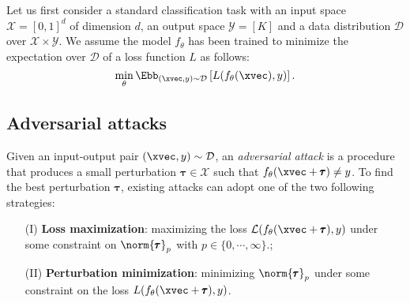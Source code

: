 

Let us first consider a standard classification task with an input space $\mathcal{X}=[0,1]^d$ of dimension $d$,  an output space $\mathcal{Y}=[K]$ and a data distribution $\mathcal D$ over $\mathcal X \times \mathcal Y$.
We assume the model $f_\theta$ has been trained to minimize the expectation over $\mathcal{D}$ of a loss function $L$ as follows:
\begin{equation}
  \min_{\theta} \Ebb_{(\xvec, y) \sim \mathcal{D}} \left[ L(f_\theta(\xvec), y) \right]. 
  \label{equation:ch2-classification}
\end{equation}

\subsection{Adversarial attacks}
\label{subsection:ch2-adversarial_attacks}
 
Given an input-output pair $(\xvec, y) \sim \mathcal{D}$, an \emph{adversarial attack} is a procedure that produces a small perturbation $\pmb{\tau} \in  \mathcal X$  such that $f_\theta(\xvec + \pmb{\tau}) \neq y$.
To find the best perturbation $\pmb{\tau}$, existing attacks can adopt one of the two following strategies:
\begin{itemize}
  \item[(I)] \textbf{Loss maximization}: maximizing the loss $\mathcal L(f_\theta(\xvec + \pmb{\tau}), y)$ under some constraint on $\norm{\pmb{\tau}}_p$ with $p \in \{0, \cdots, \infty\}$.;
  \item[(II)] \textbf{Perturbation minimization}: minimizing $\norm{\pmb{\tau}}_p$ under some constraint on the loss $L(f_\theta(\xvec + \pmb{\tau}), y)$.
\end{itemize}

